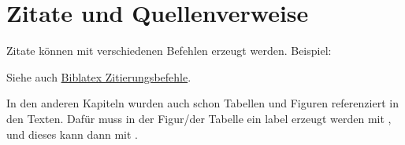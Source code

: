 \chapter{Zitate und Quellenverweise}

Zitate können mit verschiedenen Befehlen erzeugt werden. Beispiel: \parencite{diadoc} 

\noindent Siehe auch \href{https://anjalorenz.wordpress.com/2012/02/14/biblatex-kurz-im-ueberblick/}{Biblatex Zitierungsbefehle}.

In den anderen Kapiteln wurden auch schon Tabellen und Figuren referenziert in den Texten. Dafür muss in der Figur/der Tabelle ein label erzeugt werden mit , und dieses kann dann mit .